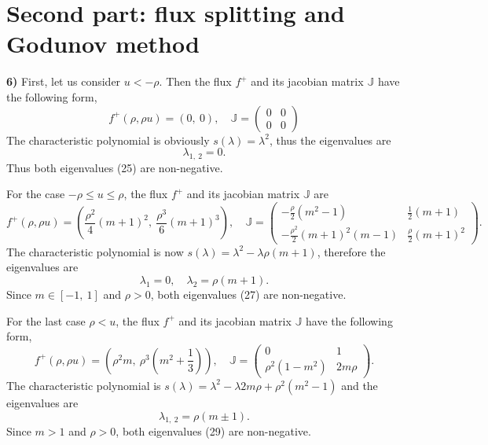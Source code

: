 \documentclass[a4paper, 10pt]{article}
\begin{document}
\section{Second part: flux splitting and Godunov method}

\textbf{6)} First, let us consider $ u < - \rho $. Then the flux $ f^{+} $ and its jacobian matrix $ \mathbb{J} $ have the following form,
\begin{equation}
f^{+} \left( \rho, \rho u \right)  = \left(0, \: 0 \right), \quad \mathbb{J} = \begin{pmatrix}
0 & 0 \\
0 & 0
\end{pmatrix}
\end{equation}
The characteristic polynomial is obviously $ s(\lambda) = \lambda^{2} $, thus the eigenvalues are
\begin{equation}
\lambda_{1, \: 2} = 0.
\end{equation}
Thus both eigenvalues (25) are non-negative.

For the case $ - \rho \leq u \leq \rho $, the flux $ f^{+} $ and its jacobian matrix $ \mathbb{J} $ are
\begingroup
\renewcommand*{\arraystretch}{2}
\begin{equation}
f^{+} \left( \rho, \rho u \right)  = \left(\frac{\rho^{2}}{4} \left( m + 1 \right)^{2} , \: \frac{\rho^{3}}{6} \left( m + 1 \right)^{3} \right), \quad \mathbb{J} = \begin{pmatrix}
- \frac{\rho}{2}\left(m^{2} - 1 \right)  & \frac{1}{2} \left( m + 1 \right) \\
- \frac{\rho^{2}}{2} \left( m + 1 \right)^{2} \left( m - 1 \right)   & \frac{\rho}{2} \left( m + 1 \right)^{2}
\end{pmatrix}.
\end{equation}
\endgroup
The characteristic polynomial is now  $ s(\lambda) = \lambda^{2} - \lambda \rho (m + 1) $, therefore the eigenvalues are
\begin{equation}
\lambda_1 = 0, \quad \lambda_2 = \rho (m + 1).
\end{equation}
Since $ m \in \left[ -1, \: 1 \right] $ and $ \rho > 0 $, both eigenvalues (27) are non-negative.

For the last case $ \rho < u $, the flux $ f^{+} $ and its jacobian matrix $ \mathbb{J} $ have the following form,
\begin{equation}
f^{+} \left( \rho, \rho u \right)  = \left( \rho^{2} m, \: \rho^{3} \left( m^{2} + \frac{1}{3} \right) \right), \quad \mathbb{J} = \begin{pmatrix}
0 & 1 \\
\rho^{2} \left( 1 - m^{2} \right) & 2m\rho
\end{pmatrix}.
\end{equation}
The characteristic polynomial is $ s(\lambda) = \lambda^{2} - \lambda 2 m \rho + \rho^2 (m^2 - 1) $ and the eigenvalues are
\begin{equation}
\lambda_{1,\: 2} = \rho (m \pm 1).
\end{equation}
Since $ m > 1 $ and $ \rho > 0 $, both eigenvalues (29) are non-negative.\\
\end{document}
